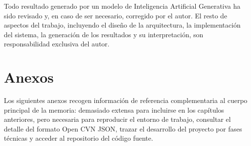 \documentclass[12pt, a4paper]{book}
\begin{document}
Todo resultado generado por un modelo de Inteligencia Artificial Generativa
ha sido revisado y, en caso de ser necesario, corregido por el autor. El
resto de aspectos del trabajo, incluyendo el diseño de la arquitectura, la
implementación del sistema, la generación de los resultados y su
interpretación, son responsabilidad exclusiva del autor.

\cleardoublepage
\chapter*{Anexos}

Los siguientes anexos recogen información de referencia complementaria al
cuerpo principal de la memoria: demasiado extensa para incluirse en los
capítulos anteriores, pero necesaria para reproducir el entorno de trabajo,
consultar el detalle del formato Open CVN JSON, trazar el desarrollo del
proyecto por fases técnicas y acceder al repositorio del código fuente.





\end{document}
